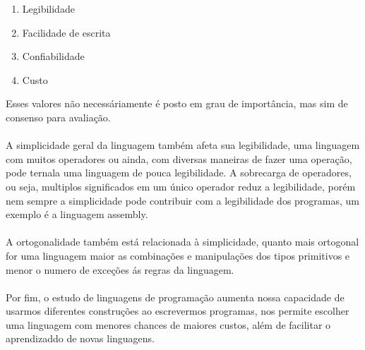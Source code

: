 \documentclass[12pt, onecolumn]{article}
\begin{document}
		\begin{enumerate}
			\item {Legibilidade}
			\item {Facilidade de escrita}
			\item {Confiabilidade}
			\item {Custo}\\
		\end{enumerate}
		Esses valores não necessáriamente é posto em grau de importância, mas 
		sim de consenso para avaliação.\\
		\\
		A simplicidade geral da linguagem também afeta sua legibilidade, uma
		linguagem com muitos operadores ou ainda, com diversas maneiras de
		fazer uma operação, pode ternala uma linguagem de pouca legibilidade.
		A sobrecarga de operadores, ou seja, multiplos significados em um único
		operador reduz a legibilidade, porém nem sempre a simplicidade pode
		contribuir com a legibilidade dos programas, um exemplo é a linguagem
		assembly.\\
		\\
		A ortogonalidade também está relacionada à simplicidade, quanto mais
		ortogonal for uma linguagem maior as combinações e manipulações dos
		tipos primitivos e menor o numero de exceções ás regras da linguagem.\\
		\\
		Por fim, o estudo de linguagens de programação aumenta nossa capacidade
		de usarmos diferentes construções ao escrevermos programas, nos 
		permite escolher uma linguagem com menores chances de maiores custos,
		além de facilitar o aprendizaddo de novas linguagens.
\end{document}
